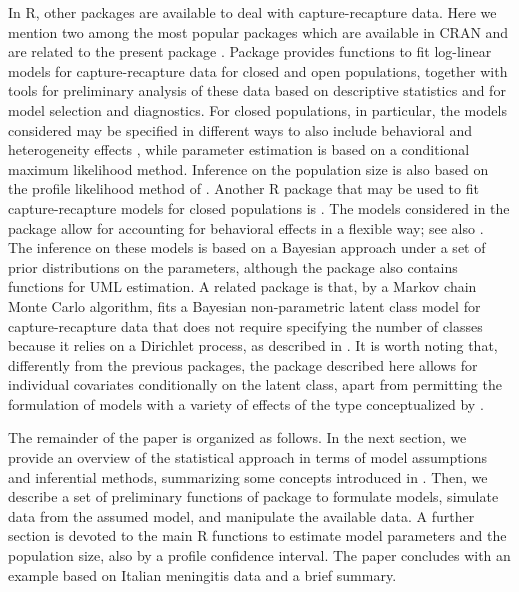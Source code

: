In R, other packages are available to deal with capture-recapture data.
Here we mention two among the most popular packages which are available in CRAN and are related to the present package .
Package  \citep{baillargeon2007rcapture} provides functions to fit log-linear models for capture-recapture data for closed and open populations, together with tools for preliminary analysis of these data based on descriptive statistics and for model selection and diagnostics.
For closed populations, in particular, the models considered may be specified in different ways to also include behavioral and heterogeneity effects \citep[see also][]{rivest2007applications}, while parameter estimation is based on a conditional maximum likelihood method.
Inference on the population size is also based on the profile likelihood method of \cite{cormack1992interval}.
Another R package that may be used to fit capture-recapture models for closed populations is .
The models considered in the package allow for accounting for behavioral effects in a flexible way; see also \cite{FegaTa2016}.
The inference on these models is based on a Bayesian approach under a set of prior distributions on the parameters, although the package also contains functions for UML estimation.
A related package is  \citep{manrique-vallier2023} that, by a Markov chain Monte Carlo algorithm, fits a Bayesian non-parametric latent class model for capture-recapture data that does not require specifying the number of classes because it relies on a Dirichlet process, as described in \cite{manrique2016bayesian}.
It is worth noting that, differently from the previous packages, the  package described here allows for individual covariates conditionally on the latent class, apart from permitting the formulation of models with a variety of effects of the type conceptualized by \cite{otis1978statistical}.

The remainder of the paper is organized as follows.
In the next section, we provide an overview of the statistical approach in terms of model assumptions and inferential methods, summarizing some concepts introduced in \cite{bartolucci2024estimating}.
Then, we describe a set of preliminary functions of package  to formulate models, simulate data from the assumed model, and manipulate the available data.
A further section is devoted to the main R functions to estimate model parameters and the population size, also by a profile confidence interval.
The paper concludes with an example based on Italian meningitis data and a brief summary.

